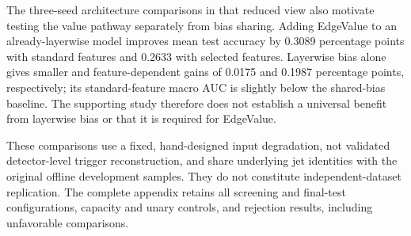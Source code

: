 The three-seed architecture comparisons in that reduced view also motivate
testing the value pathway separately from bias sharing. Adding EdgeValue
to an already-layerwise model improves mean test accuracy by 0.3089
percentage points with standard features and 0.2633 with selected
features. Layerwise bias alone gives smaller and feature-dependent gains
of 0.0175 and 0.1987 percentage points, respectively; its standard-feature
macro AUC is slightly below the shared-bias baseline. The supporting study
therefore does not establish a universal benefit from layerwise bias or
that it is required for EdgeValue.

These comparisons use a fixed, hand-designed input degradation, not
validated detector-level trigger reconstruction, and share underlying jet
identities with the original offline development samples. They do not
constitute independent-dataset replication. The complete appendix retains
all screening and final-test configurations, capacity and unary controls,
and rejection results, including unfavorable comparisons.
